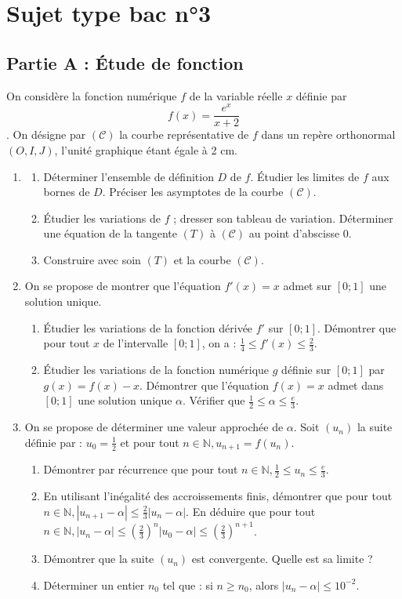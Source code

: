 \section*{Sujet type bac n°3}

\subsection*{Partie A : Étude de fonction}
On considère la fonction numérique $f$ de la variable réelle $x$ définie par $$f(x) = \frac{e^x}{x+2}$$. On désigne par $(\mathcal{C})$ la courbe représentative de $f$ dans un repère orthonormal $(O, I, J)$, l'unité graphique étant égale à 2 cm.
\begin{enumerate}
	\item \begin{enumerate}
		\item Déterminer l'ensemble de définition $D$ de $f$. Étudier les limites de $f$ aux bornes de $D$. Préciser les asymptotes de la courbe $(\mathcal{C})$.
		\item Étudier les variations de $f$ ; dresser son tableau de variation. Déterminer une équation de la tangente $(T)$ à $(\mathcal{C})$ au point d'abscisse 0.
		\item Construire avec soin $(T)$ et la courbe $(\mathcal{C})$.
	\end{enumerate}
	\item On se propose de montrer que l'équation $f'(x) = x$ admet sur $[0; 1]$ une solution unique.
	\begin{enumerate}
		\item Étudier les variations de la fonction dérivée $f'$ sur $[0; 1]$. Démontrer que pour tout $x$ de l'intervalle $[0; 1]$, on a : $\frac{1}{4} \le f'(x) \le \frac{2}{3}$.
		\item Étudier les variations de la fonction numérique $g$ définie sur $[0; 1]$ par $g(x) = f(x) - x$. Démontrer que l'équation $f(x) = x$ admet dans $[0; 1]$ une solution unique $\alpha$. Vérifier que $\frac{1}{2} \le \alpha \le \frac{e}{3}$.
	\end{enumerate}
	\item On se propose de déterminer une valeur approchée de $\alpha$. Soit $(u_n)$ la suite définie par : $u_0 = \frac{1}{2}$ et pour tout $n \in \mathbb{N}, u_{n+1} = f(u_n)$.
	\begin{enumerate}
		\item Démontrer par récurrence que pour tout $n \in \mathbb{N}, \frac{1}{2} \le u_n \le \frac{e}{3}$.
		\item En utilisant l'inégalité des accroissements finis, démontrer que pour tout $n \in \mathbb{N}, |u_{n+1} - \alpha| \le \frac{2}{3} |u_n - \alpha|$. En déduire que pour tout $n \in \mathbb{N}, |u_n - \alpha| \le (\frac{2}{3})^n |u_0 - \alpha| \le (\frac{2}{3})^{n+1}$.
		\item Démontrer que la suite $(u_n)$ est convergente. Quelle est sa limite ?
		\item Déterminer un entier $n_0$ tel que : si $n \ge n_0$, alors $|u_n - \alpha| \le 10^{-2}$.
	\end{enumerate}
\end{enumerate}

